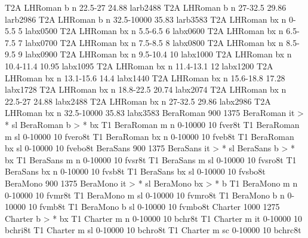 \declarefont T2A LHRoman b   n  22.5-27   24.88 larb2488
\declarefont T2A LHRoman b   n  27-32.5   29.86 larb2986
\declarefont T2A LHRoman b   n  32.5-10000 35.83 larb3583
\declarefont T2A LHRoman bx  n  0-5.5    5  labx0500
\declarefont T2A LHRoman bx  n  5.5-6.5  6  labx0600
\declarefont T2A LHRoman bx  n  6.5-7.5  7  labx0700
\declarefont T2A LHRoman bx  n  7.5-8.5  8  labx0800
\declarefont T2A LHRoman bx  n  8.5-9.5  9  labx0900
\declarefont T2A LHRoman bx  n  9.5-10.4 10 labx1000
\declarefont T2A LHRoman bx  n  10.4-11.4 10.95 labx1095
\declarefont T2A LHRoman bx  n  11.4-13.1 12    labx1200
\declarefont T2A LHRoman bx  n  13.1-15.6 14.4  labx1440
\declarefont T2A LHRoman bx  n  15.6-18.8 17.28 labx1728
\declarefont T2A LHRoman bx  n  18.8-22.5 20.74 labx2074
\declarefont T2A LHRoman bx  n  22.5-27   24.88 labx2488
\declarefont T2A LHRoman bx  n  27-32.5   29.86 labx2986
\declarefont T2A LHRoman bx  n  32.5-10000 35.83 labx3583
%
%
\declarefontfamily BeraRoman 900 1375
\fontmapshape BeraRoman it > * sl
\fontmapseries BeraRoman b > * bx
\declarefont T1 BeraRoman   m   n  0-10000   10 fver8t
\declarefont T1 BeraRoman   m   sl 0-10000   10 fvero8t
\declarefont T1 BeraRoman   bx  n  0-10000   10 fveb8t
\declarefont T1 BeraRoman   bx  sl 0-10000   10 fvebo8t
%
%
\declarefontfamily BeraSans 900 1375
\fontmapshape BeraSans it > * sl
\fontmapseries BeraSans b > * bx
\declarefont T1 BeraSans    m   n  0-10000   10 fvsr8t
\declarefont T1 BeraSans    m   sl 0-10000   10 fvsro8t
\declarefont T1 BeraSans    bx  n  0-10000   10 fvsb8t
\declarefont T1 BeraSans    bx  sl 0-10000   10 fvsbo8t
%
%
\declarefontfamily BeraMono 900 1375
\fontmapshape BeraMono it > * sl
\fontmapseries BeraMono bx > * b
\declarefont T1 BeraMono    m   n  0-10000   10 fvmr8t
\declarefont T1 BeraMono    m   sl 0-10000   10 fvmro8t
\declarefont T1 BeraMono    b   n  0-10000   10 fvmb8t
\declarefont T1 BeraMono    b   sl 0-10000   10 fvmbo8t
%
%
\declarefontfamily Charter 1000 1275
\fontmapseries Charter b > * bx
\declarefont T1 Charter m   n  0-10000   10 bchr8t
\declarefont T1 Charter m   it 0-10000   10 bchri8t
\declarefont T1 Charter m   sl 0-10000   10 bchro8t
\declarefont T1 Charter m   sc 0-10000   10 bchrc8t
